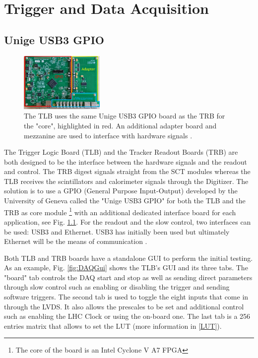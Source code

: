 \chapter{Trigger and Data Acquisition}
\section{Unige USB3 GPIO}

\begin{figure}
\centering    
\includegraphics[width=0.36\textwidth]{ChapterDAQ/Figs/GeneralDAQ/UnigeUSB3GPIO.jpg}
\caption[Unige USB3 GPIO]{The TLB uses the same Unige USB3 GPIO board as the TRB for the "core", highlighted in red. An additional adapter board and mezzanine are used to interface with hardware signals \cite{debieux_faser_2019}.}
\label{fig:UnigeUSB3GPIO}
\end{figure}

The Trigger Logic Board (TLB) and the Tracker Readout Boards (TRB) are both designed to be the interface between the hardware signals and the readout and control. The TRB digest signals straight from the SCT modules whereas the TLB receives the scintillators and calorimeter signals through the Digitizer. The solution is to use a GPIO (General Purpose Input-Output) developed by the University of Geneva called the "Unige USB3 GPIO" for both the TLB and the TRB as core module \footnote{The core of the board is an Intel Cyclone V A7 FPGA} with an additional dedicated interface board for each application, see Fig. \ref{fig:UnigeUSB3GPIO}. For the readout and the slow control, two interfaces can be used: USB3 and Ethernet. USB3 has initially been used but ultimately Ethernet will be the means of communication \cite{faser_collaboration_technical_2018}.


Both TLB and TRB boards have a standalone GUI to perform the initial testing. As an example, Fig. \ref{fig:DAQGui} shows the TLB's GUI and its three tabs. The "board" tab controls the DAQ start and stop as well as sending direct parameters through slow control such as enabling or disabling the trigger and sending software triggers. The second tab is used to toggle the eight inputs that come in through the LVDS. It also allows the prescales to be set and additional control such as enabling the LHC Clock or using the on-board one.  The last tab is a 256 entries matrix that allows to set the LUT (more information in \ref{LUT}).

